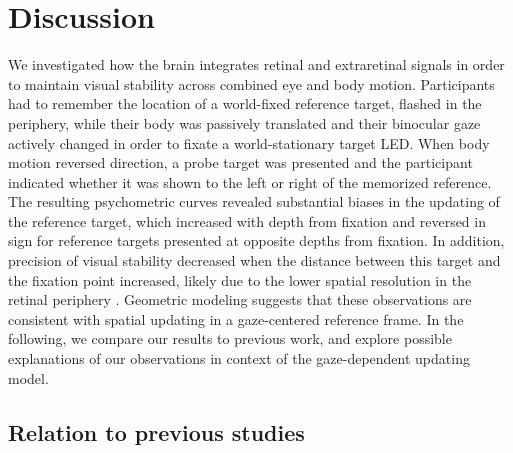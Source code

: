 \section{Discussion}

We investigated how the brain integrates retinal and extraretinal signals in order to maintain visual stability across combined eye and body motion. Participants had to remember the location of a world-fixed reference target, flashed in the periphery, while their body was passively translated and their binocular gaze actively changed in order to fixate a world-stationary target LED. When body motion reversed direction, a probe target was presented and the participant indicated whether it was shown to the left or right of the memorized reference. The resulting psychometric curves revealed substantial biases in the updating of the reference target, which increased with depth from fixation and reversed in sign for reference targets presented at opposite depths from fixation. In addition, precision of visual stability decreased when the distance between this target and the fixation point increased, likely due to the lower spatial resolution in the retinal periphery \cite{westheimer1982}. Geometric modeling suggests that these observations are consistent with spatial updating in a gaze-centered reference frame. In the following, we compare our results to previous work, and explore possible explanations of our observations in context of the gaze-dependent updating model.

\subsection{Relation to previous studies}

